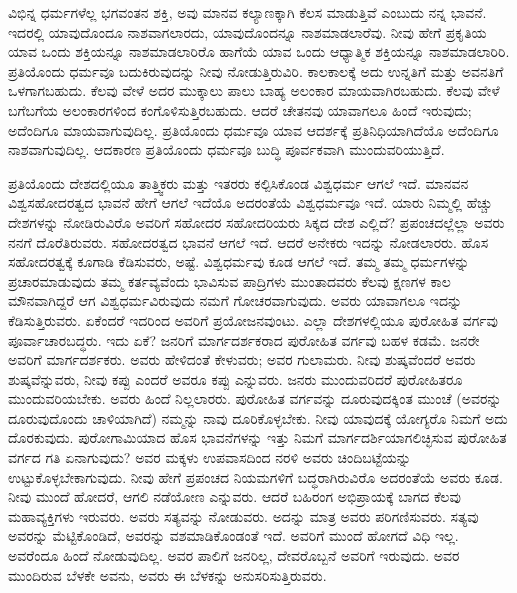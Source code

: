 
ವಿಭಿನ್ನ ಧರ್ಮಗಳೆಲ್ಲ ಭಗವಂತನ ಶಕ್ತಿ, ಅವು ಮಾನವ ಕಲ್ಯಾಣಕ್ಕಾಗಿ ಕೆಲಸ ಮಾಡುತ್ತಿವೆ ಎಂಬುದು ನನ್ನ ಭಾವನೆ. ಇದರಲ್ಲಿ ಯಾವುದೊಂದೂ ನಾಶವಾಗಲಾರದು, ಯಾವುದೊಂದನ್ನೂ ನಾಶಮಾಡಲಾರೆವು. ನೀವು ಹೇಗೆ ಪ್ರಕೃತಿಯ ಯಾವ ಒಂದು ಶಕ್ತಿಯನ್ನೂ ನಾಶಮಾಡಲಾರಿರೊ ಹಾಗೆಯೆ ಯಾವ ಒಂದು ಆಧ್ಯಾತ್ಮಿಕ ಶಕ್ತಿಯನ್ನೂ ನಾಶಮಾಡಲಾರಿರಿ. ಪ್ರತಿಯೊಂದು ಧರ್ಮವೂ ಬದುಕಿರುವುದನ್ನು ನೀವು ನೋಡುತ್ತಿರುವಿರಿ. ಕಾಲಕಾಲಕ್ಕೆ ಅದು ಉನ್ನತಿಗೆ ಮತ್ತು ಅವನತಿಗೆ ಒಳಗಾಗಬಹುದು. ಕೆಲವು ವೇಳೆ ಅದರ ಮುಕ್ಕಾಲು ಪಾಲು ಬಾಹ್ಯ ಅಲಂಕಾರ ಮಾಯವಾಗಿರಬಹುದು. ಕೆಲವು ವೇಳೆ ಬಗೆಬಗೆಯ ಅಲಂಕಾರಗಳಿಂದ ಕಂಗೊಳಿಸುತ್ತಿರಬಹುದು. ಆದರೆ ಚೇತನವು ಯಾವಾಗಲೂ ಹಿಂದೆ ಇರುವುದು; ಅದೆಂದಿಗೂ ಮಾಯವಾಗುವುದಿಲ್ಲ. ಪ್ರತಿಯೊಂದು ಧರ್ಮವೂ ಯಾವ ಆದರ್ಶಕ್ಕೆ ಪ್ರತಿನಿಧಿಯಾಗಿದೆಯೊ ಅದೆಂದಿಗೂ ನಾಶವಾಗುವುದಿಲ್ಲ. ಆದಕಾರಣ ಪ್ರತಿಯೊಂದು ಧರ್ಮವೂ ಬುದ್ಧಿ ಪೂರ್ವಕವಾಗಿ ಮುಂದುವರಿಯುತ್ತಿದೆ.


ಪ್ರತಿಯೊಂದು ದೇಶದಲ್ಲಿಯೂ ತಾತ್ತ್ವಿಕರು ಮತ್ತು ಇತರರು ಕಲ್ಪಿಸಿಕೊಂಡ ವಿಶ್ವಧರ್ಮ ಆಗಲೆ ಇದೆ. ಮಾನವನ ವಿಶ್ವಸಹೋದರತ್ವದ ಭಾವನೆ ಹೇಗೆ ಆಗಲೆ ಇದೆಯೊ ಅದರಂತೆಯೆ ವಿಶ್ವಧರ್ಮವೂ ಇದೆ. ಯಾರು ನಿಮ್ಮಲ್ಲಿ ಹೆಚ್ಚು ದೇಶಗಳನ್ನು ನೋಡಿರುವಿರೊ ಅವರಿಗೆ ಸಹೋದರ ಸಹೋದರಿಯರು ಸಿಕ್ಕದ ದೇಶ ಎಲ್ಲಿದೆ? ಪ್ರಪಂಚದಲ್ಲೆಲ್ಲಾ ಅವರು ನನಗೆ ದೊರೆತಿರುವರು. ಸಹೋದರತ್ವದ ಭಾವನೆ ಆಗಲೆ ಇದೆ. ಆದರೆ ಅನೇಕರು ಇದನ್ನು ನೋಡಲಾರರು. ಹೊಸ ಸಹೋದರತ್ವಕ್ಕೆ ಕೂಗಾಡಿ ಕೆಡಿಸುವರು, ಅಷ್ಟೆ. ವಿಶ್ವಧರ್ಮವು ಕೂಡ ಆಗಲೆ ಇದೆ. ತಮ್ಮ ತಮ್ಮ ಧರ್ಮಗಳನ್ನು ಪ್ರಚಾರಮಾಡುವುದು ತಮ್ಮ ಕರ್ತವ್ಯವೆಂದು ಭಾವಿಸುವ ಪಾದ್ರಿಗಳು ಮುಂತಾದವರು ಕೆಲವು ಕ್ಷಣಗಳ ಕಾಲ ಮೌನವಾಗಿದ್ದರೆ ಆಗ ವಿಶ್ವಧರ್ಮವಿರುವುದು ನಮಗೆ ಗೋಚರವಾಗುವುದು. ಅವರು ಯಾವಾಗಲೂ ಇದನ್ನು ಕೆಡಿಸುತ್ತಿರುವರು. ಏಕೆಂದರೆ ಇದರಿಂದ ಅವರಿಗೆ ಪ್ರಯೋಜನವುಂಟು. ಎಲ್ಲಾ ದೇಶಗಳಲ್ಲಿಯೂ ಪುರೋಹಿತ ವರ್ಗವು ಪೂರ್ವಾಚಾರಬದ್ಧರು. ಇದು ಏಕೆ? ಜನರಿಗೆ ಮಾರ್ಗದರ್ಶಕರಾದ ಪುರೋಹಿತ ವರ್ಗವು ಬಹಳ ಕಡಮೆ. ಜನರೇ ಅವರಿಗೆ ಮಾರ್ಗದರ್ಶಕರು. ಅವರು ಹೇಳಿದಂತೆ ಕೇಳುವರು; ಅವರ ಗುಲಾಮರು. ನೀವು ಶುಷ್ಕವೆಂದರೆ ಅವರು ಶುಷ್ಕವೆನ್ನುವರು, ನೀವು ಕಪ್ಪು ಎಂದರೆ ಅವರೂ ಕಪ್ಪು ಎನ್ನುವರು. ಜನರು ಮುಂದುವರಿದರೆ ಪುರೋಹಿತರೂ ಮುಂದುವರಿಯಬೇಕು. ಅವರು ಹಿಂದೆ ನಿಲ್ಲಲಾರರು. ಪುರೋಹಿತ ವರ್ಗವನ್ನು ದೂರುವುದಕ್ಕಿಂತ ಮುಂಚೆ (ಅವರನ್ನು ದೂರುವುದೊಂದು ಚಾಳಿಯಾಗಿದೆ) ನಮ್ಮನ್ನು ನಾವು ದೂರಿಕೊಳ್ಳಬೇಕು. ನೀವು ಯಾವುದಕ್ಕೆ ಯೋಗ್ಯರೊ ನಿಮಗೆ ಅದು ದೊರಕುವುದು. ಪುರೋಗಾಮಿಯಾದ ಹೊಸ ಭಾವನೆಗಳನ್ನು ಇತ್ತು ನಿಮಗೆ ಮಾರ್ಗದರ್ಶಿಯಾಗಲಿಚ್ಛಿಸುವ ಪುರೋಹಿತ ವರ್ಗದ ಗತಿ ಏನಾಗುವುದು? ಅವರ ಮಕ್ಕಳು ಉಪವಾಸದಿಂದ ನರಳಿ ಅವರು ಚಿಂದಿಬಟ್ಟೆಯನ್ನು ಉಟ್ಟುಕೊಳ್ಳಬೇಕಾಗುವುದು. ನೀವು ಹೇಗೆ ಪ್ರಪಂಚದ ನಿಯಮಗಳಿಗೆ ಬದ್ಧರಾಗಿರುವಿರೊ ಅದರಂತೆಯೆ ಅವರು ಕೂಡ. ನೀವು ಮುಂದೆ ಹೋದರೆ, ಆಗಲಿ ನಡೆಯೋಣ ಎನ್ನುವರು. ಆದರೆ ಬಹಿರಂಗ ಅಭಿಪ್ರಾಯಕ್ಕೆ ಬಾಗದ ಕೆಲವು ಮಹಾವ್ಯಕ್ತಿಗಳು ಇರುವರು. ಅವರು ಸತ್ಯವನ್ನು ನೋಡುವರು. ಅದನ್ನು ಮಾತ್ರ ಅವರು ಪರಿಗಣಿಸುವರು. ಸತ್ಯವು ಅವರನ್ನು ಮೆಟ್ಟಿಕೊಂಡಿದೆ, ಅವರನ್ನು ವಶಮಾಡಿಕೊಂಡಂತೆ ಇದೆ. ಅವರಿಗೆ ಮುಂದೆ ಹೋಗದೆ ವಿಧಿ ಇಲ್ಲ. ಅವರೆಂದೂ ಹಿಂದೆ ನೋಡುವುದಿಲ್ಲ. ಅವರ ಪಾಲಿಗೆ ಜನರಿಲ್ಲ, ದೇವರೊಬ್ಬನೆ ಅವರಿಗೆ ಇರುವುದು. ಅವರ ಮುಂದಿರುವ ಬೆಳಕೇ ಅವನು, ಅವರು ಈ ಬೆಳಕನ್ನು ಅನುಸರಿಸುತ್ತಿರುವರು.


